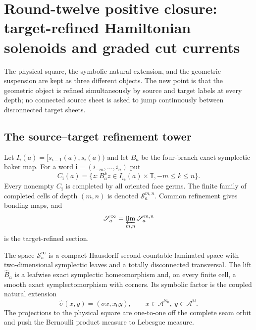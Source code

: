 \section{Round-twelve positive closure: target-refined Hamiltonian solenoids and graded cut currents}
\label{sec:r12-a1}

The physical square, the symbolic natural extension, and the geometric
suspension are kept as three different objects.  The new point is that the
geometric object is refined simultaneously by source and target labels at
every depth; no connected source sheet is asked to jump continuously between
disconnected target sheets.

\subsection{The source--target refinement tower}

Let $I_i(a)=[s_{i-1}(a),s_i(a))$ and let $B_a$ be the four-branch exact
symplectic baker map.  For a word
$\mathbf i=(i_{-m},\ldots,i_n)$ put
\[
 C_{\mathbf i}(a)=\{z:B_a^kz\in I_{i_k}(a)\times\mathbb T,
                    -m\le k\le n\}.
\]
Every nonempty $C_{\mathbf i}$ is completed by all oriented face germs.  The
finite family of completed cells of depth $(m,n)$ is denoted
$\mathscr S_a^{m,n}$.  Common refinement gives bonding maps, and
\[
 \mathscr S_a^\infty=\varprojlim_{m,n}\mathscr S_a^{m,n}
\]
is the target-refined section.

\begin{theorem}
\label{thm:r12-a1-refinement}
The space $\mathscr S_a^\infty$ is a compact Hausdorff second-countable
laminated space with two-dimensional symplectic leaves and a totally
disconnected transversal.  The lift $\widehat B_a$ is a leafwise exact
symplectic homeomorphism and, on every finite cell, a smooth exact
symplectomorphism with corners.  Its symbolic factor is the coupled natural
extension
\[
 \widehat\sigma(x,y)=(\sigma x,x_0y),
 \qquad x\in\mathcal A^{\mathbb N_0},\ y\in\mathcal A^{\mathbb N}.
\]
The projections to the physical square are one-to-one off the complete seam
orbit and push the Bernoulli product measure to Lebesgue measure.
\end{theorem}

